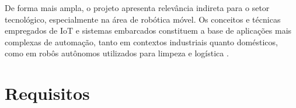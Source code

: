 De forma mais ampla, o projeto apresenta relevância indireta para o setor tecnológico, especialmente na área de robótica móvel. Os conceitos e técnicas empregados de IoT e sistemas embarcados constituem a base de aplicações mais complexas de automação, tanto em contextos industriais quanto domésticos, como em robôs autônomos utilizados para limpeza e logística \cite{simulacao2024}.



\section{Requisitos}


